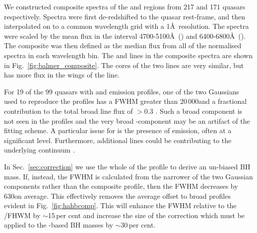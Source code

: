 We constructed composite spectra of the \ha and \hb regions from 217 and 171 quasars respectively. 
Spectra were first de-redshifted to the quasar rest-frame, and then interpolated on to a common wavelength grid with a 1\AA\, resolution. 
The spectra were scaled by the mean flux in the interval 4700-5100\AA\, (\hbns) and 6400-6800\AA\, (\hans). 
The composite was then defined as the median flux from all of the normalised spectra in each wavelength bin. 
The \ha and \hb lines in the composite spectra are shown in Fig.~\ref{fig:balmer_composite}.
The cores of the two lines are very similar, but \hb has more flux in the wings of the line. 

For 19 of the 99 quasars with \hb and \ha emission profiles, one of the two Gaussians used to reproduce the \hb profiles has a FWHM greater than 20\,000\kms and a fractional contribution to the total \hb broad line flux of $>$0.3 \citep{marziani09,marziani13}.  
Such a broad component is not seen in the \ha profiles and the very broad \hbns-component may be an artifact of the fitting scheme.
A particular issue for \hb is the presence of  emission, often at a significant level.
Furthermore, additional lines could be contributing to the underlying continuum \citep[e.g. the ,5017 doublet;][]{veron02,zamfir10}. 

In Sec.~\ref{sec:correction} we use the whole of the \hb profile to derive an un-biased BH mass.  
If, instead, the FWHM is calculated from the narrower of the two Gaussian components rather than the composite profile, then the \hb FWHM decreases by 630\kms on average.
This effectively removes the average offset to broad \hb profiles evident in Fig.~\ref{fig:hahbcomp}. 
This will enhance the  FWHM relative to the \hans/\hb FHWM by $\sim$15\,per cent and increase the size of the correction which must be applied to the -based BH masses by $\sim$30\,per cent. 

